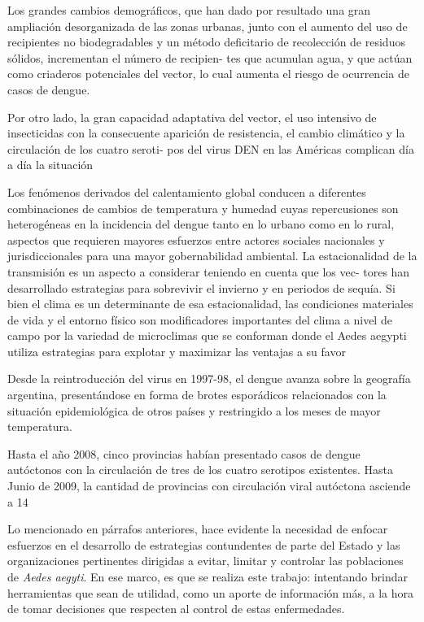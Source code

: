 Los grandes cambios demográficos, que han dado por resultado una gran ampliación desorganizada
de las zonas urbanas, junto con el aumento del uso de recipientes no biodegradables
y un método deficitario de recolección de residuos sólidos, incrementan el número de recipien-
tes que acumulan agua, y que actúan como criaderos potenciales del vector, lo cual aumenta el
riesgo de ocurrencia de casos de dengue.


Por  otro  lado,  la  gran  capacidad  adaptativa  del  vector,  el  uso  intensivo  de  insecticidas  con  la
consecuente aparición de resistencia, el cambio climático y la circulación de los cuatro seroti-
pos del virus DEN en las Américas complican día a día la situación



Los fenómenos derivados del calentamiento global conducen a diferentes combinaciones de
cambios  de  temperatura  y  humedad  cuyas  repercusiones  son  heterogéneas  en  la  incidencia
del  dengue  tanto  en  lo  urbano  como  en  lo  rural,  aspectos  que  requieren  mayores  esfuerzos
entre actores sociales nacionales y jurisdiccionales para una mayor gobernabilidad ambiental.
La estacionalidad de la transmisión es un aspecto a considerar teniendo en cuenta que los vec-
tores han desarrollado estrategias para sobrevivir el invierno y en periodos de sequía. Si bien el
clima es un determinante de esa estacionalidad, las condiciones materiales de vida y el  entorno
físico son modificadores importantes del clima a nivel de campo por la variedad de microclimas
que se conforman donde el Aedes aegypti utiliza estrategias para explotar y maximizar las ventajas a su favor


Desde la reintroducción del virus en 1997-98, el dengue avanza sobre la geografía argentina,
presentándose en forma de brotes esporádicos relacionados con la situación epidemiológica
de otros países y restringido a los meses de mayor temperatura.



Hasta  el  año  2008,  cinco  provincias  habían  presentado  casos  de  dengue  autóctonos  con  la
circulación de tres de los cuatro serotipos existentes. Hasta Junio de 2009, la
cantidad de provincias con circulación viral autóctona asciende a 14



Lo mencionado en párrafos anteriores, hace evidente la necesidad de enfocar esfuerzos
en el desarrollo de estrategias contundentes de parte del Estado y las organizaciones
pertinentes dirigidas a evitar, limitar y controlar las poblaciones de \textit{Aedes aegyti}.
En ese marco, es que se realiza este trabajo: intentando brindar herramientas
que sean de utilidad, como un aporte de información más, a la hora de tomar
decisiones que respecten al control de estas enfermedades.

